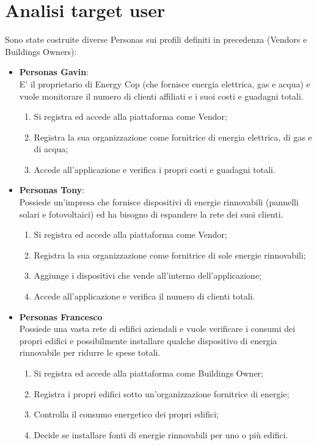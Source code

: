 \documentclass{report}
\begin{document}
\section{Analisi target user}
Sono state costruite diverse Personas sui profili definiti in precedenza (Vendors e Buildings Owners):
\begin{itemize}
 \item \textbf{Personas Gavin}: 
\\ E' il proprietario di Energy Cop (che fornisce energia elettrica, gas e acqua) e vuole monitorare il numero di clienti affiliati e i suoi costi e guadagni totali.
\begin{enumerate}
\item Si registra ed accede alla piattaforma come Vendor;
\item Registra la sua organizzazione come fornitrice di energia elettrica, di gas e di acqua;
\item Accede all'applicazione e verifica i propri costi e guadagni totali.
\end{enumerate}

 \item \textbf{Personas Tony}: 
\\ Possiede un'impresa che fornisce dispositivi di energie rinnovabili (pannelli solari e fotovoltaici) ed ha bisogno di espandere la rete dei suoi clienti.
\begin{enumerate}
\item Si registra ed accede alla piattaforma come Vendor;
\item Registra la sua organizzazione come fornitrice di sole energie rinnovabili;
\item Aggiunge i dispositivi che vende all'interno dell'applicazione;
\item Accede all'applicazione e verifica il numero di clienti totali.
\end{enumerate}

\item \textbf{Personas Francesco}
\\ Possiede una vasta rete di edifici aziendali e vuole verificare i consumi dei propri edifici e possibilmente installare qualche dispositivo di energia rinnovabile per ridurre le spese totali.
\begin{enumerate}
\item Si registra ed accede alla piattaforma come Buildings Owner;
\item Registra i propri edifici sotto un'organizzazione fornitrice di energie;
\item Controlla il consumo energetico dei propri edifici;
\item Decide se installare fonti di energie rinnovabili per uno o più edifici.
\end{enumerate}


\end{itemize}
\end{document}
